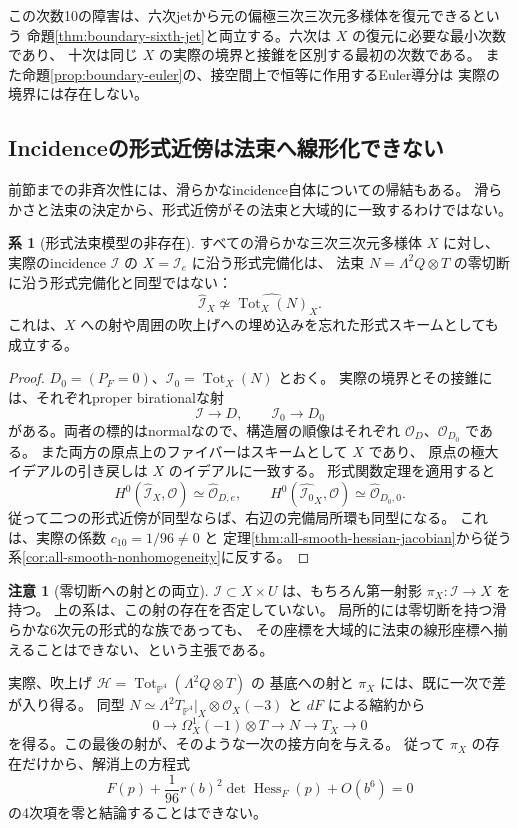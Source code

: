 \documentclass[a4paper,11pt]{ltjsarticle}
\theoremstyle{definition}
\newtheorem{remark}[theorem]{注意}
\newtheorem{corollary}[theorem]{系}
\newcommand{\OO}{\mathcal O}
\newcommand{\PP}{\mathbb P}
\begin{document}
この次数10の障害は、六次jetから元の偏極三次三次元多様体を復元できるという
命題\ref{thm:boundary-sixth-jet}と両立する。六次は $X$ の復元に必要な最小次数であり、
十次は同じ $X$ の実際の境界と接錐を区別する最初の次数である。
また命題\ref{prop:boundary-euler}の、接空間上で恒等に作用するEuler導分は
実際の境界には存在しない。

\subsection{Incidenceの形式近傍は法束へ線形化できない}
\label{subsec:incidence-formal-neighborhood}

前節までの非斉次性には、滑らかなincidence自体についての帰結もある。
滑らかさと法束の決定から、形式近傍がその法束と大域的に一致するわけではない。

\begin{corollary}[形式法束模型の非存在]
\label{cor:incidence-not-formal-normal-bundle}
すべての滑らかな三次三次元多様体 $X$ に対し、実際のincidence
$\mathcal I$ の $X=\mathcal I_e$ に沿う形式完備化は、
法束 $N=\Lambda^2Q\otimes T$ の零切断に沿う形式完備化と同型ではない：
\[
 \widehat{\mathcal I}_X
 \not\simeq
 \widehat{\operatorname{Tot}_X(N)}_X.
\]
これは、$X$ への射や周囲の吹上げへの埋め込みを忘れた形式スキームとしても成立する。
\end{corollary}
\begin{proof}
$D_0=(P_F=0)$、$\mathcal I_0=\operatorname{Tot}_X(N)$ とおく。
実際の境界とその接錐には、それぞれproper birationalな射
\[
 \mathcal I\longrightarrow D,\qquad
 \mathcal I_0\longrightarrow D_0
\]
がある。両者の標的はnormalなので、構造層の順像はそれぞれ
$\OO_D$、$\OO_{D_0}$ である。
また両方の原点上のファイバーはスキームとして $X$ であり、
原点の極大イデアルの引き戻しは $X$ のイデアルに一致する。
形式関数定理\cite[Theorem 30.20.5, Tag 02OC]{StacksFormalFunctions}を適用すると
\[
 H^0(\widehat{\mathcal I}_X,\OO)
      \simeq\widehat{\OO}_{D,e},\qquad
 H^0(\widehat{\mathcal I_0}_X,\OO)
      \simeq\widehat{\OO}_{D_0,0}.
\]
従って二つの形式近傍が同型ならば、右辺の完備局所環も同型になる。
これは、実際の係数 $c_{10}=1/96\ne0$ と
定理\ref{thm:all-smooth-hessian-jacobian}から従う
系\ref{cor:all-smooth-nonhomogeneity}に反する。
\end{proof}

\begin{remark}[零切断への射との両立]
$\mathcal I\subset X\times U$ は、もちろん第一射影
$\pi_X\colon\mathcal I\to X$ を持つ。
上の系は、この射の存在を否定していない。
局所的には零切断を持つ滑らかな6次元の形式的な族であっても、
その座標を大域的に法束の線形座標へ揃えることはできない、という主張である。

実際、吹上げ
$\mathcal H=\operatorname{Tot}_{\PP^4}(\Lambda^2Q\otimes T)$ の
基底への射と $\pi_X$ には、既に一次で差が入り得る。
同型
$N\simeq\Lambda^2T_{\PP^4}|_X\otimes\OO_X(-3)$ と $dF$ による縮約から
\[
 0\longrightarrow\Omega_X^1(-1)\otimes T
 \longrightarrow N\longrightarrow T_X\longrightarrow0
\]
を得る。この最後の射が、そのような一次の接方向を与える。
従って $\pi_X$ の存在だけから、解消上の方程式
\[
 F(p)+\frac1{96}r(b)^2\det\operatorname{Hess}_F(p)+O(b^6)=0
\]
の4次項を零と結論することはできない。
\end{remark}
\end{document}
